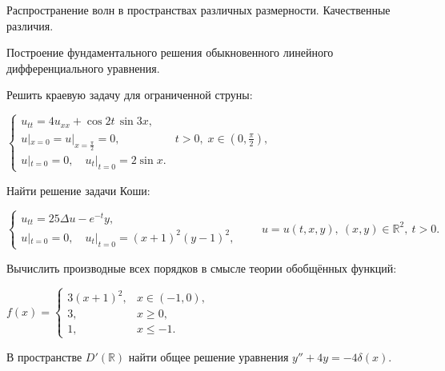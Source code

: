 
\begin{cond}
	Распространение волн в пространствах различных размерности. Качественные различия.
\end{cond}

\begin{cond}
	Построение фундаментального решения обыкновенного линейного дифференциального уравнения.
\end{cond}

\begin{cond}
	Решить краевую задачу для ограниченной струны:

	\(
	\begin{cases}
		u_{tt} = 4u_{xx} + \cos 2t \,\sin 3x,                                               \\
		u|_{x=0} = u|_{x=\frac{\pi}{2}} = 0, & t > 0,\; x \in \left(0,\frac{\pi}{2}\right), \\
		u|_{t=0} = 0,\quad u_t|_{t=0} = 2\sin x.
	\end{cases}
	\)
\end{cond}

\begin{cond}
	Найти решение задачи Коши:

	\(
	\begin{cases}
		u_{tt} = 25\Delta u - e^{-t}y, \\
		u|_{t=0} = 0,\quad u_t|_{t=0} = (x+1)^2 (y-1)^2,
	\end{cases}
	\qquad
	u = u(t,x,y),\ (x,y)\in\mathbb{R}^2,\ t>0.
	\)
\end{cond}

\begin{cond}
	Вычислить производные всех порядков в смысле теории обобщённых функций:

	\(
	f(x) =
	\begin{cases}
		3(x+1)^2, & x \in (-1,0), \\
		3,        & x \ge 0,      \\
		1,        & x \le -1.
	\end{cases}
	\)
\end{cond}

\begin{cond}
	В пространстве \(D'(\mathbb{R})\) найти общее решение уравнения
	$y'' + 4y = -4\delta(x)$.
\end{cond}

